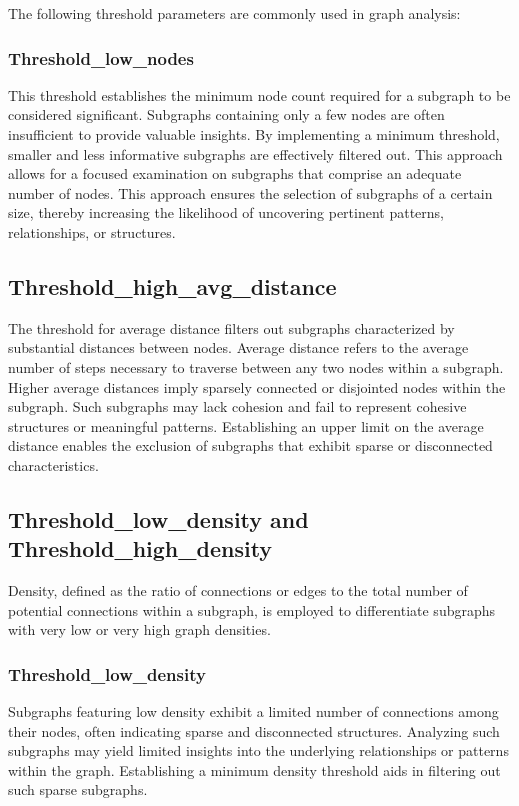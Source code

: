 \documentclass[10pt,twocolumn,a4paper]{article}
\begin{document}
The following threshold parameters are commonly used in graph analysis:

\subsubsection{Threshold\_low\_nodes}
This threshold establishes the minimum node count required for a subgraph to be considered significant. Subgraphs containing only a few nodes are often insufficient to provide valuable insights. By implementing a minimum threshold, smaller and less informative subgraphs are effectively filtered out. This approach allows for a focused examination on subgraphs that comprise an adequate number of nodes.
This approach ensures the selection of subgraphs of a certain size, thereby increasing the likelihood of uncovering pertinent patterns, relationships, or structures.

\subsection{Threshold\_high\_avg\_distance}

    The threshold for average distance filters out subgraphs characterized by substantial distances between nodes. Average distance refers to the average number of steps necessary to traverse between any two nodes within a subgraph. Higher average distances imply sparsely connected or disjointed nodes within the subgraph. Such subgraphs may lack cohesion and fail to represent cohesive structures or meaningful patterns. Establishing an upper limit on the average distance enables the exclusion of subgraphs that exhibit sparse or disconnected characteristics.

\subsection{Threshold\_low\_density and Threshold\_high\_density}

Density, defined as the ratio of connections or edges to the total number of potential connections within a subgraph, is employed to differentiate subgraphs with very low or very high graph densities.

\subsubsection{Threshold\_low\_density}
Subgraphs featuring low density exhibit a limited number of connections among their nodes, often indicating sparse and disconnected structures. Analyzing such subgraphs may yield limited insights into the underlying relationships or patterns within the graph. Establishing a minimum density threshold aids in filtering out such sparse subgraphs.
\end{document}
